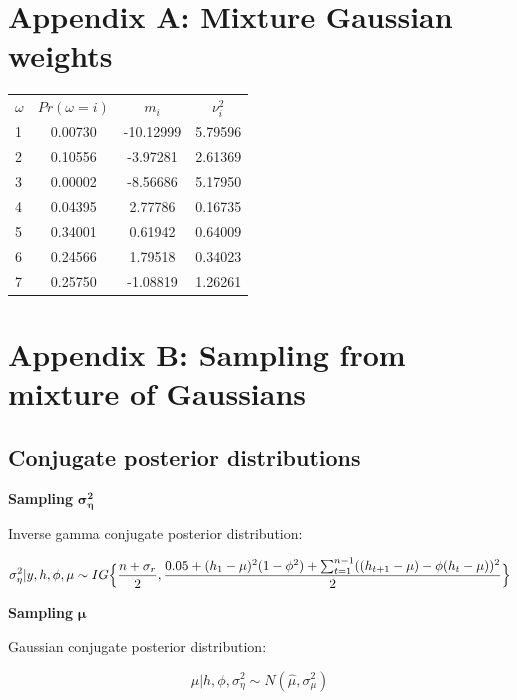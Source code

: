 \documentclass[12pt, a4paper]{article}
\begin{document}
\newpage



\newpage

\section{Appendix A: Mixture Gaussian weights}

\begin{table}[H]
    \centering
    \begin{tabular}{lccc} 
          $\omega$ &$Pr(\omega = i)$&  $m_i$&  $\nu^2_i$\\ 
          1&0.00730  &  -10.12999&  5.79596\\ 
          2&0.10556  &   -3.97281 &  2.61369\\ 
          3&0.00002 &  -8.56686 &   5.17950\\ 
          4&0.04395 &  2.77786  &   0.16735 \\ 
          5&0.34001&   0.61942    &  0.64009\\ 
          6&0.24566 &  1.79518    &  0.34023 \\ 
          7&0.25750 &  -1.08819    &  1.26261\\ 
    \end{tabular} 
\end{table}

\newpage

\section{Appendix B: Sampling from mixture of Gaussians}

\subsection*{Conjugate posterior distributions}

\textbf{Sampling} $\boldsymbol{\sigma_{\eta}^2}$

Inverse gamma conjugate posterior distribution:

$$
\sigma^2_{\eta} | y,h,\phi,\mu \sim IG \Bigl\{\frac{n+\sigma_r}{2}, \frac{0.05 + (h_1 - \mu)^2 (1 - \phi^2) + \sum_{t=1}^{n-1}((h_{t+1} - \mu) - \phi(h_t - \mu))^2}{2}\Bigr\}
$$

\textbf{Sampling}  $\boldsymbol{\mu}$

Gaussian conjugate posterior distribution:

$$
\mu | h,\phi,\sigma^2_{\eta}  \sim N(\hat{\mu}, \sigma^2_{\mu})
$$
\end{document}
